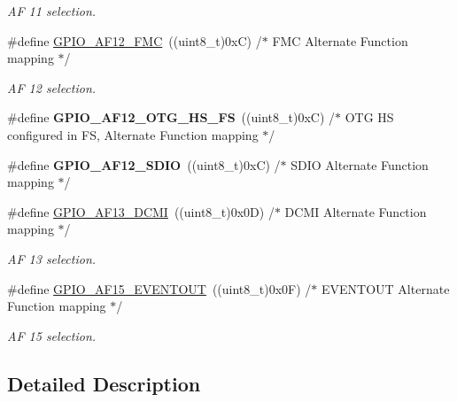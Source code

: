 \begin{DoxyCompactItemize}
\begin{DoxyCompactList}\small\item\em AF 11 selection. \end{DoxyCompactList}\item 
\#define \hyperlink{group___g_p_i_o___alternate__function__selection_ga56d7cc07c907d85e043eb44e4b9b4540}{G\+P\+I\+O\+\_\+\+A\+F12\+\_\+\+F\+MC}~((uint8\+\_\+t)0x\+C)  /$\ast$ F\+M\+C Alternate Function mapping                      $\ast$/\hypertarget{group___g_p_i_o___alternate__function__selection_ga56d7cc07c907d85e043eb44e4b9b4540}{}\label{group___g_p_i_o___alternate__function__selection_ga56d7cc07c907d85e043eb44e4b9b4540}

\begin{DoxyCompactList}\small\item\em AF 12 selection. \end{DoxyCompactList}\item 
\#define {\bfseries G\+P\+I\+O\+\_\+\+A\+F12\+\_\+\+O\+T\+G\+\_\+\+H\+S\+\_\+\+FS}~((uint8\+\_\+t)0x\+C)  /$\ast$ O\+T\+G H\+S configured in F\+S, Alternate Function mapping $\ast$/\hypertarget{group___g_p_i_o___alternate__function__selection_gaa62b899aeaa8ca3c4a9a62e0ccae881a}{}\label{group___g_p_i_o___alternate__function__selection_gaa62b899aeaa8ca3c4a9a62e0ccae881a}

\item 
\#define {\bfseries G\+P\+I\+O\+\_\+\+A\+F12\+\_\+\+S\+D\+IO}~((uint8\+\_\+t)0x\+C)  /$\ast$ S\+D\+I\+O Alternate Function mapping                     $\ast$/\hypertarget{group___g_p_i_o___alternate__function__selection_ga6283d1ddba2a46b7f501580e3de6fe60}{}\label{group___g_p_i_o___alternate__function__selection_ga6283d1ddba2a46b7f501580e3de6fe60}

\item 
\#define \hyperlink{group___g_p_i_o___alternate__function__selection_gac7ccbdfe96d75805d7fc7dcd821d0fb4}{G\+P\+I\+O\+\_\+\+A\+F13\+\_\+\+D\+C\+MI}~((uint8\+\_\+t)0x0\+D)  /$\ast$ D\+C\+M\+I Alternate Function mapping $\ast$/\hypertarget{group___g_p_i_o___alternate__function__selection_gac7ccbdfe96d75805d7fc7dcd821d0fb4}{}\label{group___g_p_i_o___alternate__function__selection_gac7ccbdfe96d75805d7fc7dcd821d0fb4}

\begin{DoxyCompactList}\small\item\em AF 13 selection. \end{DoxyCompactList}\item 
\#define \hyperlink{group___g_p_i_o___alternate__function__selection_ga6a9e7cd61d906b36a1044acef59d245e}{G\+P\+I\+O\+\_\+\+A\+F15\+\_\+\+E\+V\+E\+N\+T\+O\+UT}~((uint8\+\_\+t)0x0\+F)  /$\ast$ E\+V\+E\+N\+T\+O\+U\+T Alternate Function mapping $\ast$/\hypertarget{group___g_p_i_o___alternate__function__selection_ga6a9e7cd61d906b36a1044acef59d245e}{}\label{group___g_p_i_o___alternate__function__selection_ga6a9e7cd61d906b36a1044acef59d245e}

\begin{DoxyCompactList}\small\item\em AF 15 selection. \end{DoxyCompactList}\end{DoxyCompactItemize}


\subsection{Detailed Description}
